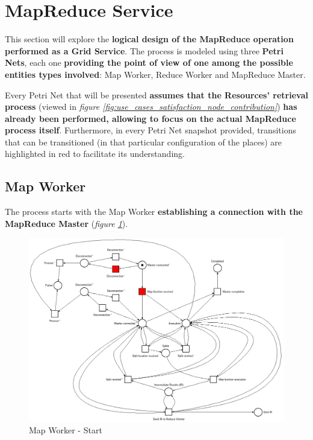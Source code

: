 \section{MapReduce Service}\label{mapreduce_service}
This section will explore the \textbf{logical design of the MapReduce operation performed as a Grid Service}. The process is modeled using three \textbf{Petri Nets}, each one \textbf{providing the point of view of one among the possible entities types involved}: Map Worker, Reduce Worker and MapReduce Master.

Every Petri Net that will be presented \textbf{assumes that the Resources' retrieval process} (viewed in \textit{figure \ref{fig:use_cases_satisfaction_node_contribution}}) \textbf{has already been performed, allowing to focus on the actual MapReduce process itself}.
Furthermore, in every Petri Net snapshot provided, transitions that can be transitioned (in that particular configuration of the places) are highlighted in red to facilitate its understanding.
  
\subsection{Map Worker}
The process starts with the Map Worker \textbf{establishing a connection with the MapReduce Master} (\textit{figure \ref{fig:map_worker_petri_net_1}}).

\vspace{5mm}

\begin{figure}[!ht]
    \centering
    \includegraphics[width=\linewidth]{document/chapters/chapter_5/images/map_worker_petri_net_1.png}
    \caption{Map Worker - Start}
    \label{fig:map_worker_petri_net_1}
\end{figure}

